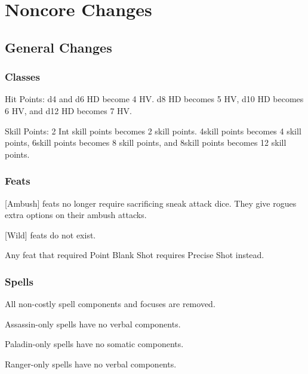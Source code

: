 \chapter{Noncore Changes}

\section{General Changes}

\subsection{Classes}
\begin{itemize*}
\item Hit Points: d4 and d6 HD become 4 HV. d8 HD becomes 5 HV, d10 HD becomes 6 HV, and d12 HD becomes 7 HV.
\item Skill Points: 2 \add Int skill points becomes 2 skill points. 4\add skill points becomes 4 skill points, 6\add skill points becomes 8 skill points, and 8\add skill points becomes 12 skill points.
\end{itemize*}

\subsection{Feats}
\begin{itemize*}
\item {[}Ambush] feats no longer require sacrificing sneak attack dice. They give rogues extra options on their ambush attacks.
\item {[}Wild] feats do not exist.
\item Any feat that required Point Blank Shot requires Precise Shot instead.
\end{itemize*}

\subsection{Spells}
\begin{itemize*}
\item All non-costly spell components and focuses are removed.
\item Assassin-only spells have no verbal components.
\item Paladin-only spells have no somatic components.
\item Ranger-only spells have no verbal components.
\end{itemize*}

